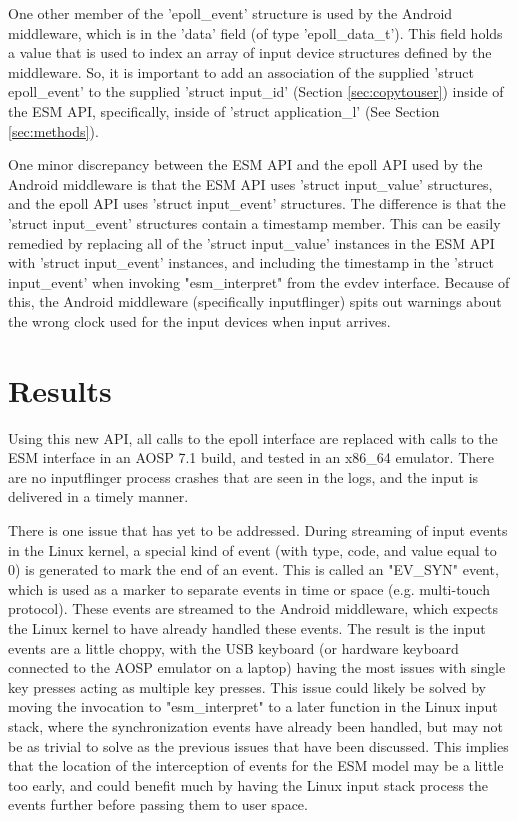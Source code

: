 \documentclass[10pt,journal,compsoc]{IEEEtran}
\begin{document}
One other member of the 'epoll\_event' structure is used by the Android middleware, which is in the 'data' field (of type 'epoll\_data\_t'). This field holds a value that is used to index an array of input device structures defined by the middleware. So, it is important to add an association of the supplied 'struct epoll\_event' to the supplied 'struct input\_id' (Section \ref{sec:copytouser}) inside of the ESM API, specifically, inside of 'struct application\_l' (See Section \ref{sec:methods}).

One minor discrepancy between the ESM API and the epoll API used by the Android middleware is that the ESM API uses 'struct input\_value' structures, and the epoll API uses 'struct input\_event' structures. The difference is that the 'struct input\_event' structures contain a timestamp member. This can be easily remedied by replacing all of the 'struct input\_value' instances in the ESM API with 'struct input\_event' instances, and including the timestamp in the 'struct input\_event' when invoking "esm\_interpret" from the evdev interface. Because of this, the Android middleware (specifically inputflinger) spits out warnings about the wrong clock used for the input devices when input arrives.

\section{Results}
\label{sec:results}
Using this new API, all calls to the epoll interface are replaced with calls to the ESM interface in an AOSP 7.1 build, and tested in an x86\_64 emulator. There are no inputflinger process crashes that are seen in the logs, and the input is delivered in a timely manner.

There is one issue that has yet to be addressed. During streaming of input events in the Linux kernel, a special kind of event (with type, code, and value equal to 0) is generated to mark the end of an event. This is called an "EV\_SYN" event, which is used as a marker to separate events in time or space (e.g. multi-touch protocol). These events are streamed to the Android middleware, which expects the Linux kernel to have already handled these events. The result is the input events are a little choppy, with the USB keyboard (or hardware keyboard connected to the AOSP emulator on a laptop) having the most issues with single key presses acting as multiple key presses. This issue could likely be solved by moving the invocation to "esm\_interpret" to a later function in the Linux input stack, where the synchronization events have already been handled, but may not be as trivial to solve as the previous issues that have been discussed. This implies that the location of the interception of events for the ESM model may be a little too early, and could benefit much by having the Linux input stack process the events further before passing them to user space.
\end{document}
